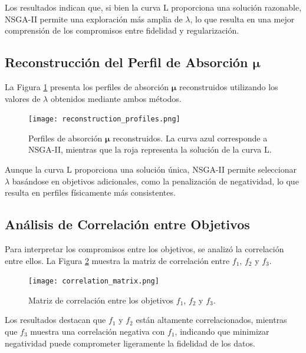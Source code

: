 Los resultados indican que, si bien la curva L proporciona una solución razonable, NSGA-II permite una exploración más amplia de \( \lambda \), lo que resulta en una mejor comprensión de los compromisos entre fidelidad y regularización.

\subsection{Reconstrucción del Perfil de Absorción \( \mathbf{\mu} \)} \label{sec:results:reconstruction}

La Figura \ref{fig:reconstruction_profiles} presenta los perfiles de absorción \( \mathbf{\mu} \) reconstruidos utilizando los valores de \( \lambda \) obtenidos mediante ambos métodos.

\begin{figure}[h]
    \centering
    \texttt{[image: reconstruction\_profiles.png]}
    \caption{Perfiles de absorción \( \mathbf{\mu} \) reconstruidos. La curva azul corresponde a NSGA-II, mientras que la roja representa la solución de la curva L.}
    \label{fig:reconstruction_profiles}
\end{figure}

Aunque la curva L proporciona una solución única, NSGA-II permite seleccionar \( \lambda \) basándose en objetivos adicionales, como la penalización de negatividad, lo que resulta en perfiles físicamente más consistentes.

\subsection{Análisis de Correlación entre Objetivos} \label{sec:results:correlation}

Para interpretar los compromisos entre los objetivos, se analizó la correlación entre ellos. La Figura \ref{fig:correlation_matrix} muestra la matriz de correlación entre \( f_1 \), \( f_2 \) y \( f_3 \).

\begin{figure}[h]
    \centering
    \texttt{[image: correlation\_matrix.png]}
    \caption{Matriz de correlación entre los objetivos \( f_1 \), \( f_2 \) y \( f_3 \).}
    \label{fig:correlation_matrix}
\end{figure}

Los resultados destacan que \( f_1 \) y \( f_2 \) están altamente correlacionados, mientras que \( f_3 \) muestra una correlación negativa con \( f_1 \), indicando que minimizar negatividad puede comprometer ligeramente la fidelidad de los datos.


